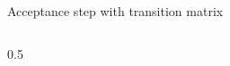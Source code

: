 \documentclass[aspectratio=169, 10pt, compress]{beamer}
\begin{document}
\begin{frame}{Acceptance step with transition matrix}
\begin{columns}[t]
\begin{column}{0.5\textwidth}
\end{column}
\end{columns}
\end{frame}
\end{document}
